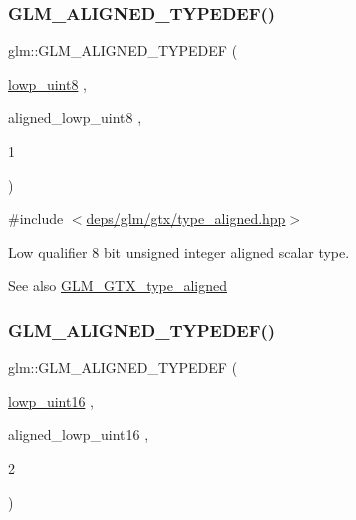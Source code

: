 \subsubsection{\texorpdfstring{G\+L\+M\+\_\+\+A\+L\+I\+G\+N\+E\+D\+\_\+\+T\+Y\+P\+E\+D\+E\+F()}{GLM\_ALIGNED\_TYPEDEF()}\hspace{0.1cm}{\footnotesize\ttfamily [69/209]}}
{\footnotesize\ttfamily glm\+::\+G\+L\+M\+\_\+\+A\+L\+I\+G\+N\+E\+D\+\_\+\+T\+Y\+P\+E\+D\+EF (\begin{DoxyParamCaption}\item[{\hyperlink{group__gtc__type__precision_ga4d9dc08b7b248a386dfe9afd00fc6b1e}{lowp\+\_\+uint8}}]{,  }\item[{aligned\+\_\+lowp\+\_\+uint8}]{,  }\item[{1}]{ }\end{DoxyParamCaption})}



{\ttfamily \#include $<$\hyperlink{gtx_2type__aligned_8hpp}{deps/glm/gtx/type\+\_\+aligned.\+hpp}$>$}

Low qualifier 8 bit unsigned integer aligned scalar type. \begin{DoxySeeAlso}{See also}
\hyperlink{group__gtx__type__aligned}{G\+L\+M\+\_\+\+G\+T\+X\+\_\+type\+\_\+aligned} 
\end{DoxySeeAlso}
\mbox{\label{group__gtx__type__aligned_ga1246094581af624aca6c7499aaabf801}} 
\subsubsection{\texorpdfstring{G\+L\+M\+\_\+\+A\+L\+I\+G\+N\+E\+D\+\_\+\+T\+Y\+P\+E\+D\+E\+F()}{GLM\_ALIGNED\_TYPEDEF()}\hspace{0.1cm}{\footnotesize\ttfamily [70/209]}}
{\footnotesize\ttfamily glm\+::\+G\+L\+M\+\_\+\+A\+L\+I\+G\+N\+E\+D\+\_\+\+T\+Y\+P\+E\+D\+EF (\begin{DoxyParamCaption}\item[{\hyperlink{group__gtc__type__precision_ga9b8409887319f62f06e664f6ca121b9d}{lowp\+\_\+uint16}}]{,  }\item[{aligned\+\_\+lowp\+\_\+uint16}]{,  }\item[{2}]{ }\end{DoxyParamCaption})}



